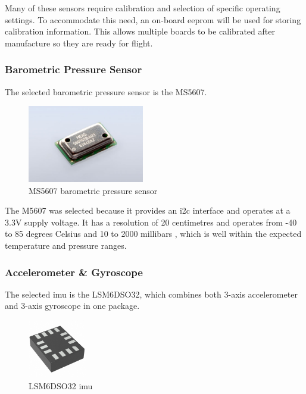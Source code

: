 Many of these sensors require calibration and selection of specific operating settings. To accommodate this need, an
on-board \gls{eeprom} will be used for storing calibration information. This allows multiple boards to be calibrated
after manufacture so they are ready for flight.

\subsubsection{Barometric Pressure Sensor}

The selected barometric pressure sensor is the MS5607.

\begin{figure}[H]
    \centering
    \includegraphics[width=2in]{assets/images/ms5607.jpg}
    \caption{MS5607 barometric pressure sensor \cite{ms5607-pic}}
\end{figure}

The M5607 was selected because it provides an \gls{i2c} interface and operates at a 3.3V supply voltage.
\cite[1]{ms5607-datasheet} It has a resolution of 20 centimetres \cite[1]{ms5607-datasheet} and operates from -40 to 85
degrees Celsius and 10 to 2000 millibars \cite[1]{ms5607-datasheet}, which is well within the expected temperature and
pressure ranges.

\subsubsection{Accelerometer \& Gyroscope}

The selected \gls{imu} is the LSM6DSO32, which combines both 3-axis accelerometer and 3-axis gyroscope in one package.

\begin{figure}[H]
    \centering
    \includegraphics[width=1in]{assets/images/lsm6dso32.jpg}
    \caption{LSM6DSO32 \gls{imu} \cite{lsm6dso32-pic}}
\end{figure}

